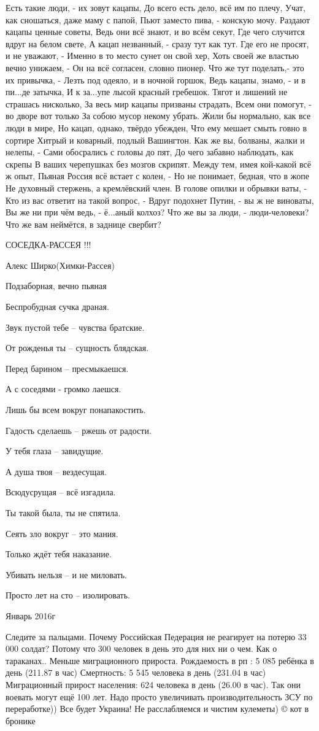 Есть такие люди, - их зовут кацапы, До всего есть дело, всё им по плечу, Учат,
как сношаться, даже маму с папой, Пьют заместо пива, - конскую мочу. Раздают
кацапы ценные советы, Ведь они всё знают, и во всём секут, Где чего случится
вдруг на белом свете, А кацап незванный, - сразу тут как тут. Где его не
просят, и не уважают, - Именно в то место сунет он свой хер, Хоть своей же
властью вечно унижаем, - Он на всё согласен, словно пионер. Что же тут
поделать,- это их привычка, - Лезть под одеяло, и в ночной горшок, Ведь кацапы,
знамо, - и в пи...де затычка, И к за...упе лысой красный гребешок. Тягот и
лишений не страшась нисколько, За весь мир кацапы призваны страдать, Всем они
помогут, - во дворе вот только За собою мусор некому убрать. Жили бы нормально,
как все люди в мире, Но кацап, однако, твёрдо убежден, Что ему мешает смыть
говно в сортире Хитрый и коварный, подлый Вашингтон. Как же вы, болваны, жалки
и нелепы, - Сами обосрались с головы до пят, До чего забавно наблюдать, как
скрепы В ваших черепушках без мозгов скрипят. Между тем, имея кой-какой всё ж
опыт, Пьяная Россия всё встает с колен, - Но не понимает, бедная, что в жопе Не
духовный стержень, а кремлёвский член. В голове опилки и обрывки ваты, - Кто из
вас ответит на такой вопрос, - Вдруг подохнет Путин, - вы ж не виноваты, Вы же
ни при чём ведь, - ё...аный колхоз? Что же вы за люди, - люди-человеки? Что же
вам неймётся, в заднице свербит?

СОСЕДКА-РАССЕЯ !!!

Алекс Ширко(Химки-Рассея)

Подзаборная, вечно пьяная

Беспробудная сучка драная.

Звук пустой тебе – чувства братские.

От рожденья ты – сущность блядская.

Перед барином – пресмыкаешся.

А с соседями - громко лаешся.

Лишь бы всем вокруг понапакостить.

Гадость сделаешь – ржешь от радости.

У тебя глаза – завидущие.

А душа твоя – вездесущая.

Всюдусрущая – всё изгадила.

Ты такой была, ты не спятила.

Сеять зло вокруг – это мания.

Только ждёт тебя наказание.

Убивать нельзя – и не миловать.

Просто лет на сто – изолировать.

Январь 2016г

Следите за пальцами. Почему Российская Педерация не реагирует на потерю 33 000
солдат? Потому что 300 человек в день это для них ни о чем. Как о тараканах..
Меньше миграционного прироста. Рождаемость в рп : 5 085 ребёнка в день (211.87
в час) Смертность: 5 545 человека в день (231.04 в час) Миграционный прирост
населения: 624 человека в день (26.00 в час). Так они воевать могут ещё 100
лет. Надо просто увеличивать производительность ЗСУ по переработке)) Все будет
Украина! Не расслабляемся и чистим кулеметы) © кот в бронике
